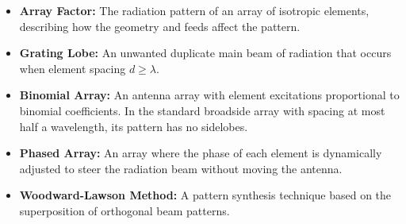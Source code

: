 \documentclass[12pt,a4paper]{article}
\begin{document}
\begin{tcolorbox}[defbox, title={\textbf{One-Line Definitions}}]
\begin{itemize}[leftmargin=*, itemsep=2pt, topsep=0pt]
  \item \textbf{Array Factor:} The radiation pattern of an array of isotropic elements, describing how the geometry and feeds affect the pattern.
  \item \textbf{Grating Lobe:} An unwanted duplicate main beam of radiation that occurs when element spacing $d \ge \lambda$.
  \item \textbf{Binomial Array:} An antenna array with element excitations proportional to binomial coefficients. In the standard broadside array with spacing at most half a wavelength, its pattern has no sidelobes.
  \item \textbf{Phased Array:} An array where the phase of each element is dynamically adjusted to steer the radiation beam without moving the antenna.
  \item \textbf{Woodward-Lawson Method:} A pattern synthesis technique based on the superposition of orthogonal beam patterns.
\end{itemize}
\end{tcolorbox}
\end{document}
